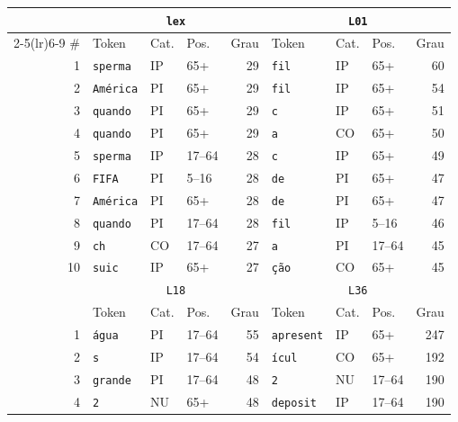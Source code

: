 \footnotesize
\setlength{\tabcolsep}{4pt}
\begin{tabular}{rlllrlllr}
\toprule
 & \multicolumn{4}{c}{\texttt{lex}} & \multicolumn{4}{c}{\texttt{L01}} \\
\cmidrule(lr){2-5}\cmidrule(lr){6-9}
\# & Token & Cat. & Pos. & Grau & Token & Cat. & Pos. & Grau \\
\midrule
1 & \texttt{\textvisiblespace{}sperma} & IP & 65+ & 29 & \texttt{\textvisiblespace{}fil} & IP & 65+ & 60 \\
2 & \texttt{\textvisiblespace{}América} & PI & 65+ & 29 & \texttt{\textvisiblespace{}fil} & IP & 65+ & 54 \\
3 & \texttt{\textvisiblespace{}quando} & PI & 65+ & 29 & \texttt{\textvisiblespace{}c} & IP & 65+ & 51 \\
4 & \texttt{\textvisiblespace{}quando} & PI & 65+ & 29 & \texttt{a} & CO & 65+ & 50 \\
5 & \texttt{\textvisiblespace{}sperma} & IP & 17–64 & 28 & \texttt{\textvisiblespace{}c} & IP & 65+ & 49 \\
6 & \texttt{\textvisiblespace{}FIFA} & PI & 5–16 & 28 & \texttt{\textvisiblespace{}de} & PI & 65+ & 47 \\
7 & \texttt{\textvisiblespace{}América} & PI & 65+ & 28 & \texttt{\textvisiblespace{}de} & PI & 65+ & 47 \\
8 & \texttt{\textvisiblespace{}quando} & PI & 17–64 & 28 & \texttt{\textvisiblespace{}fil} & IP & 5–16 & 46 \\
9 & \texttt{ch} & CO & 17–64 & 27 & \texttt{\textvisiblespace{}a} & PI & 17–64 & 45 \\
10 & \texttt{\textvisiblespace{}suic} & IP & 65+ & 27 & \texttt{ção} & CO & 65+ & 45 \\
\midrule
 & \multicolumn{4}{c}{\texttt{L18}} & \multicolumn{4}{c}{\texttt{L36}} \\
 & Token & Cat. & Pos. & Grau & Token & Cat. & Pos. & Grau \\
\midrule
1 & \texttt{\textvisiblespace{}água} & PI & 17–64 & 55 & \texttt{\textvisiblespace{}apresent} & IP & 65+ & 247 \\
2 & \texttt{\textvisiblespace{}s} & IP & 17–64 & 54 & \texttt{ícul} & CO & 65+ & 192 \\
3 & \texttt{\textvisiblespace{}grande} & PI & 17–64 & 48 & \texttt{2} & NU & 17–64 & 190 \\
4 & \texttt{2} & NU & 65+ & 48 & \texttt{\textvisiblespace{}deposit} & IP & 17–64 & 190 \\

\end{tabular}
